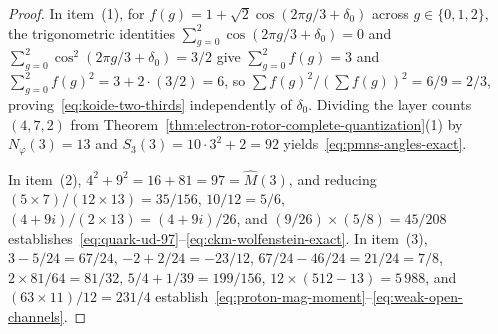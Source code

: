 \documentclass[11pt,a4paper]{article}
\theoremstyle{plain}
\theoremstyle{definition}
\begin{document}
\begin{proof}
In item~(1), for $f(g) = 1 + \sqrt{2}\cos(2\pi g/3 + \delta_0)$ across $g \in \{0, 1, 2\}$, the trigonometric identities $\sum_{g=0}^2 \cos(2\pi g/3 + \delta_0) = 0$ and $\sum_{g=0}^2 \cos^2(2\pi g/3 + \delta_0) = 3/2$ give $\sum_{g=0}^2 f(g) = 3$ and $\sum_{g=0}^2 f(g)^2 = 3 + 2\cdot(3/2) = 6$, so $\sum f(g)^2 / (\sum f(g))^2 = 6 / 9 = 2/3$, proving~\eqref{eq:koide-two-thirds} independently of $\delta_0$. Dividing the layer counts $(4, 7, 2)$ from Theorem~\ref{thm:electron-rotor-complete-quantization}(1) by $N_\varphi(3) = 13$ and $S_3(3) = 10\cdot 3^2 + 2 = 92$ yields~\eqref{eq:pmns-angles-exact}.

In item~(2), $4^2 + 9^2 = 16 + 81 = 97 = \widehat{M}(3)$, and reducing $(5\times 7)/(12\times 13) = 35/156$, $10/12 = 5/6$, $(4 + 9i)/(2\times 13) = (4+9i)/26$, and $(9/26)\times(5/8) = 45/208$ establishes~\eqref{eq:quark-ud-97}--\eqref{eq:ckm-wolfenstein-exact}. In item~(3), $3 - 5/24 = 67/24$, $-2 + 2/24 = -23/12$, $67/24 - 46/24 = 21/24 = 7/8$, $2\times 81/64 = 81/32$, $5/4 + 1/39 = 199/156$, $12\times(512 - 13) = 5\,988$, and $(63\times 11)/12 = 231/4$ establish~\eqref{eq:proton-mag-moment}--\eqref{eq:weak-open-channels}.
\end{proof}
\end{document}
